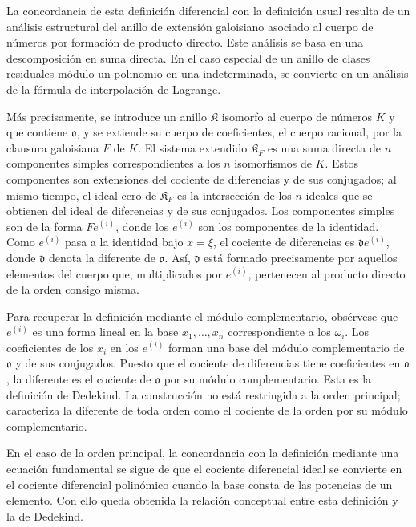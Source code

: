 La concordancia de esta definición diferencial con la definición usual resulta de un análisis estructural del anillo de extensión galoisiano asociado al cuerpo de números por formación de producto directo. Este análisis se basa en una descomposición en suma directa. En el caso especial de un anillo de clases residuales módulo un polinomio en una indeterminada, se convierte en un análisis de la fórmula de interpolación de Lagrange.

Más precisamente, se introduce un anillo $\mathfrak K$ isomorfo al cuerpo de números $K$ y que contiene $\mathfrak o$, y se extiende su cuerpo de coeficientes, el cuerpo racional, por la clausura galoisiana $F$ de $K$. El sistema extendido $\mathfrak K_F$ es una suma directa de $n$ componentes simples correspondientes a los $n$ isomorfismos de $K$. Estos componentes son extensiones del cociente de diferencias y de sus conjugados; al mismo tiempo, el ideal cero de $\mathfrak K_F$ es la intersección de los $n$ ideales que se obtienen del ideal de diferencias y de sus conjugados. Los componentes simples son de la forma $Fe^{(i)}$, donde los $e^{(i)}$ son los componentes de la identidad. Como $e^{(i)}$ pasa a la identidad bajo $x=\xi$, el cociente de diferencias es $\mathfrak d e^{(i)}$, donde $\mathfrak d$ denota la diferente de $\mathfrak o$. Así, $\mathfrak d$ está formado precisamente por aquellos elementos del cuerpo que, multiplicados por $e^{(i)}$, pertenecen al producto directo de la orden consigo misma.

Para recuperar la definición mediante el módulo complementario, obsérvese que $e^{(i)}$ es una forma lineal en la base $x_1,\ldots,x_n$ correspondiente a los $\omega_i$. Los coeficientes de los $x_i$ en los $e^{(i)}$ forman una base del módulo complementario de $\mathfrak o$ y de sus conjugados. Puesto que el cociente de diferencias tiene coeficientes en $\mathfrak o$, la diferente es el cociente de $\mathfrak o$ por su módulo complementario. Esta es la definición de Dedekind. La construcción no está restringida a la orden principal; caracteriza la diferente de toda orden como el cociente de la orden por su módulo complementario.

En el caso de la orden principal, la concordancia con la definición mediante una ecuación fundamental se sigue de que el cociente diferencial ideal se convierte en el cociente diferencial polinómico cuando la base consta de las potencias de un elemento. Con ello queda obtenida la relación conceptual entre esta definición y la de Dedekind.

